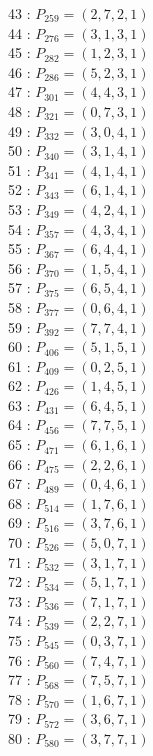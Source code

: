 \documentclass{article}
\begin{document}
{\begin{multicols}{3}
43 : $P_{259}=( 2, 7, 2, 1 )$\\
44 : $P_{276}=( 3, 1, 3, 1 )$\\
45 : $P_{282}=( 1, 2, 3, 1 )$\\
46 : $P_{286}=( 5, 2, 3, 1 )$\\
47 : $P_{301}=( 4, 4, 3, 1 )$\\
48 : $P_{321}=( 0, 7, 3, 1 )$\\
49 : $P_{332}=( 3, 0, 4, 1 )$\\
50 : $P_{340}=( 3, 1, 4, 1 )$\\
51 : $P_{341}=( 4, 1, 4, 1 )$\\
52 : $P_{343}=( 6, 1, 4, 1 )$\\
53 : $P_{349}=( 4, 2, 4, 1 )$\\
54 : $P_{357}=( 4, 3, 4, 1 )$\\
55 : $P_{367}=( 6, 4, 4, 1 )$\\
56 : $P_{370}=( 1, 5, 4, 1 )$\\
57 : $P_{375}=( 6, 5, 4, 1 )$\\
58 : $P_{377}=( 0, 6, 4, 1 )$\\
59 : $P_{392}=( 7, 7, 4, 1 )$\\
60 : $P_{406}=( 5, 1, 5, 1 )$\\
61 : $P_{409}=( 0, 2, 5, 1 )$\\
62 : $P_{426}=( 1, 4, 5, 1 )$\\
63 : $P_{431}=( 6, 4, 5, 1 )$\\
64 : $P_{456}=( 7, 7, 5, 1 )$\\
65 : $P_{471}=( 6, 1, 6, 1 )$\\
66 : $P_{475}=( 2, 2, 6, 1 )$\\
67 : $P_{489}=( 0, 4, 6, 1 )$\\
68 : $P_{514}=( 1, 7, 6, 1 )$\\
69 : $P_{516}=( 3, 7, 6, 1 )$\\
70 : $P_{526}=( 5, 0, 7, 1 )$\\
71 : $P_{532}=( 3, 1, 7, 1 )$\\
72 : $P_{534}=( 5, 1, 7, 1 )$\\
73 : $P_{536}=( 7, 1, 7, 1 )$\\
74 : $P_{539}=( 2, 2, 7, 1 )$\\
75 : $P_{545}=( 0, 3, 7, 1 )$\\
76 : $P_{560}=( 7, 4, 7, 1 )$\\
77 : $P_{568}=( 7, 5, 7, 1 )$\\
78 : $P_{570}=( 1, 6, 7, 1 )$\\
79 : $P_{572}=( 3, 6, 7, 1 )$\\
80 : $P_{580}=( 3, 7, 7, 1 )$\\
\end{multicols}


}
\end{document}
